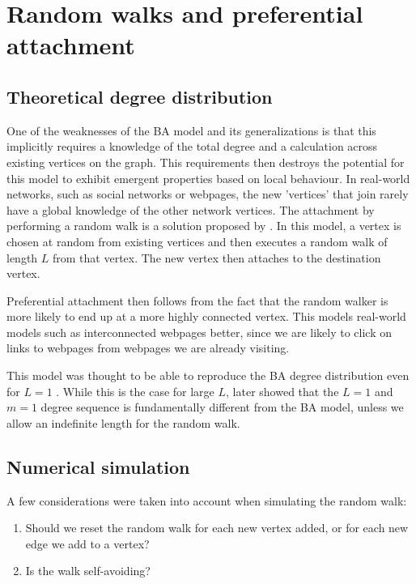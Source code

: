 \section{Random walks and preferential attachment}\label{section:random-walk}

\subsection{Theoretical degree distribution}
One of the weaknesses of the BA model and its generalizations is that this implicitly requires a knowledge of the total degree and a calculation across existing vertices on the graph. This requirements then destroys the potential for this model to exhibit emergent properties based on local behaviour. In real-world networks, such as social networks or webpages, the new 'vertices' that join rarely have a global knowledge of the other network vertices. The attachment by performing a random walk is a solution proposed by \citet{Saramaki2004}. In this model, a vertex is chosen at random from existing vertices and then executes a random walk of length $L$ from that vertex. The new vertex then attaches to the destination vertex. 

Preferential attachment then follows from the fact that the random walker is more likely to end up at a more highly connected vertex. This models real-world models such as interconnected webpages better, since we are likely to click on links to webpages from webpages we are already visiting. 

This model was thought to be able to reproduce the BA degree distribution even for $L=1$ \citep{Saramaki2004,J.P.Saramaki2004}. While this is the case for large $L$, \citet{Cannings2013} later showed that the $L=1$ and $m=1$ degree sequence is fundamentally different from the BA model, unless we allow an indefinite length for the random walk. 

\subsection{Numerical simulation}

A few considerations were taken into account when simulating the random walk:

\begin{enumerate}
	\item Should we reset the random walk for each new vertex added, or for each new edge we add to a vertex?
	\item Is the walk self-avoiding?
\end{enumerate}

